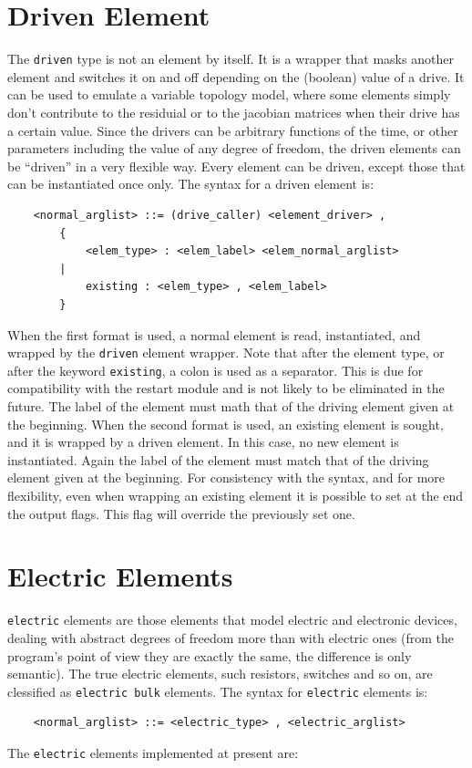\documentclass[10pt,dvips]{report}
\begin{document}
\section{Driven Element}
The {\tt driven} type is not an element by itself. It is a wrapper that
masks another element and switches it on and off depending on the (boolean)
value of a drive. It can be used to emulate a variable topology model, where 
some elements simply don't contribute to the residuial or to the jacobian
matrices when their drive has a certain value. Since the drivers can be
arbitrary functions of the time, or other parameters including the value of
any degree of freedom, the driven elements can be ``driven'' in a very
flexible way. Every element can be driven, except those that can be
instantiated once only.
The syntax for a driven element is:
\begin{verbatim}
    <normal_arglist> ::= (drive_caller) <element_driver> ,
        {
            <elem_type> : <elem_label> <elem_normal_arglist> 
        |   
            existing : <elem_type> , <elem_label>
        }
\end{verbatim}
When the first format is used, a normal element is read, instantiated, and
wrapped by the {\tt driven} element wrapper. Note that after the element type,
or after the keyword {\tt existing}, a colon is used as a separator.
This is due for compatibility with the restart module and is not likely 
to be eliminated in the future. 
The label of the element must math that of the driving element given at
the beginning.
When the second format is used, an existing element is sought, and it is
wrapped by a driven element. In this case, no new element is instantiated.
Again the label of the element must match that of the driving element given 
at the beginning. For consistency with the syntax, and for more flexibility,
even when wrapping an existing element it is possible to set at the end the
output flags. This flag will override the previously set one.





\section{Electric Elements}
{\tt electric} elements are those elements that model electric and electronic
devices, dealing with abstract degrees of freedom more than with electric
ones (from the program's point of view they are exactly the same, the
difference is only semantic). The true electric elements, such resistors,
switches and so on, are clessified as {\tt electric bulk} elements.
The syntax for {\tt electric} elements is:
\begin{verbatim}
    <normal_arglist> ::= <electric_type> , <electric_arglist>
\end{verbatim}
The {\tt electric} elements implemented at present are:
\end{document}
